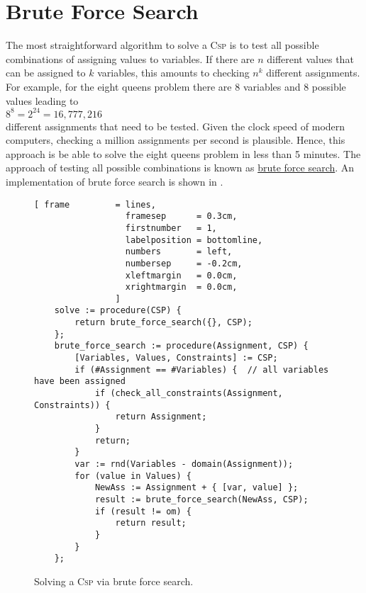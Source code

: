 \section{Brute Force Search}
The most straightforward algorithm to solve a \textsc{Csp} is to test all possible combinations of assigning
values to variables.  If there are $n$ different values that can be assigned to $k$ variables, this amounts to 
checking $n^k$ different assignments.  For example, for the eight queens problem there are 8 variables and
8 possible values leading to 
\\[0.2cm]
\hspace*{1.3cm}
$8^8 = 2^{24} = 16,777,216$
\\[0.2cm]
different assignments that need to be tested.  Given the clock speed of modern computers, checking a million
assignments per second is plausible.  Hence, this approach is be able to solve the eight queens problem in
less than 5 minutes.  The approach of testing all possible combinations is known as
\href{https://en.wikipedia.org/wiki/Brute-force_search}{brute force search}.  An implementation of brute force
search is shown in . 

\begin{figure}[!ht]
\centering
\begin{Verbatim}[ frame         = lines, 
                  framesep      = 0.3cm, 
                  firstnumber   = 1,
                  labelposition = bottomline,
                  numbers       = left,
                  numbersep     = -0.2cm,
                  xleftmargin   = 0.0cm,
                  xrightmargin  = 0.0cm,
                ]
    solve := procedure(CSP) {
        return brute_force_search({}, CSP);
    };
    brute_force_search := procedure(Assignment, CSP) {
        [Variables, Values, Constraints] := CSP;
        if (#Assignment == #Variables) {  // all variables have been assigned
            if (check_all_constraints(Assignment, Constraints)) {
                return Assignment;
            }
            return;
        }
        var := rnd(Variables - domain(Assignment));
        for (value in Values) {
            NewAss := Assignment + { [var, value] };
            result := brute_force_search(NewAss, CSP);
            if (result != om) {
                return result;
            }
        }
    };
\end{Verbatim}
\vspace*{-0.3cm}
\caption{Solving a \textsc{Csp} via brute force search.}
\label{fig:csp-brute-force.stlx}
\end{figure}

